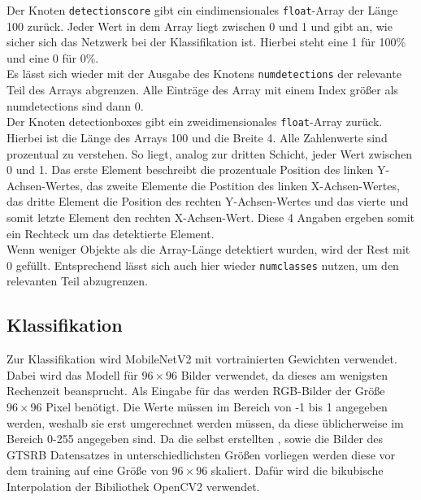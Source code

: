 \documentclass[12pt,a4paper,ngerman,enabledeprecatedfontcommands]{scrreprt}
\begin{document}
Der Knoten \texttt{detection\textunderscore score} gibt ein eindimensionales \texttt{float}-Array der Länge 100 zurück. Jeder Wert in dem Array liegt zwischen 0 und 1 und gibt an, wie sicher sich das Netzwerk bei der \gls{Klassifikation} ist. Hierbei steht eine 1 für 100\% und eine 0 für 0\%.\\
Es lässt sich wieder mit der Ausgabe des Knotens \texttt{num\textunderscore detections} der relevante Teil des Arrays abgrenzen. Alle Einträge des Array mit einem Index größer als num\textunderscore detections sind dann 0. \\

Der Knoten detection\textunderscore boxes gibt ein zweidimensionales \texttt{float}-Array zurück. Hierbei ist die Länge des Arrays 100 und die Breite 4. Alle Zahlenwerte sind prozentual zu verstehen. So liegt, analog zur dritten Schicht, jeder Wert zwischen 0 und 1. 
Das erste Element beschreibt die prozentuale Position des linken Y-Achsen-Wertes, das zweite Elemente die Postition des linken X-Achsen-Wertes, das dritte Element die Position des rechten Y-Achsen-Wertes und das vierte und somit letzte Element den rechten X-Achsen-Wert. Diese 4 Angaben ergeben somit ein Rechteck um das detektierte Element.\\
Wenn weniger Objekte als die Array-Länge detektiert wurden, wird der Rest mit 0 gefüllt. Entsprechend lässt sich auch hier wieder \texttt{num\textunderscore classes} nutzen, um den relevanten Teil abzugrenzen.\\

\subsection{Klassifikation}
Zur \gls{Klassifikation} wird MobileNetV2\cite{DBLP:journals/corr/abs-1801-04381} mit vortrainierten Gewichten verwendet. Dabei wird das Modell für $96\times96$ Bilder verwendet, da dieses am wenigsten Rechenzeit beansprucht.
Als Eingabe für das  werden RGB-Bilder der Größe $96\times96$ Pixel benötigt. Die Werte müssen im Bereich von -1 bis 1 angegeben werden, weshalb sie erst umgerechnet werden müssen, da diese üblicherweise im Bereich 0-255 angegeben sind.
Da die selbst erstellten , sowie die Bilder des GTSRB Datensatzes in unterschiedlichsten Größen vorliegen werden diese vor dem training auf eine Größe von $96\times96$ skaliert.
Dafür wird die bikubische Interpolation der Bibiliothek \gls{OpenCV2} verwendet. 
\end{document}
